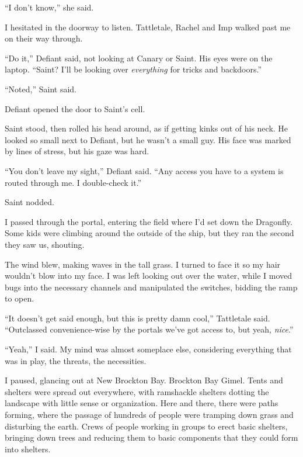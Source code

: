 ``I don't know,'' she said.



I hesitated in the doorway to listen.  Tattletale, Rachel and Imp walked past me on their way through.



``Do it,'' Defiant said, not looking at Canary or Saint.  His eyes were on the laptop.  ``Saint?  I'll be looking over \emph{everything} for tricks and backdoors.''



``Noted,'' Saint said.



Defiant opened the door to Saint's cell.



Saint stood, then rolled his head around, as if getting kinks out of his neck.  He looked so small next to Defiant, but he wasn't a small guy.  His face was marked by lines of stress, but his gaze was hard.



``You don't leave my sight,'' Defiant said.  ``Any access you have to a system is routed through me.  I double-check it.''



Saint nodded.



I passed through the portal, entering the field where I'd set down the Dragonfly. Some kids were climbing around the outside of the ship, but they ran the second they saw us, shouting.



The wind blew, making waves in the tall grass.  I turned to face it so my hair wouldn't blow into my face.  I was left looking out over the water, while I moved bugs into the necessary channels and manipulated the switches, bidding the ramp to open.



``It doesn't get said enough, but this is pretty damn cool,'' Tattletale said.  ``Outclassed convenience-wise by the portals we've got access to, but yeah, \emph{nice}.''



``Yeah,'' I said.  My mind was almost someplace else, considering everything that was in play, the threats, the necessities.



I paused, glancing out at New Brockton Bay.  Brockton Bay Gimel.  Tents and shelters were spread out everywhere, with ramshackle shelters dotting the landscape with little sense or organization.  Here and there, there were paths forming, where the passage of hundreds of people were tramping down grass and disturbing the earth.  Crews of people working in groups to erect basic shelters, bringing down trees and reducing them to basic components that they could form into shelters.



